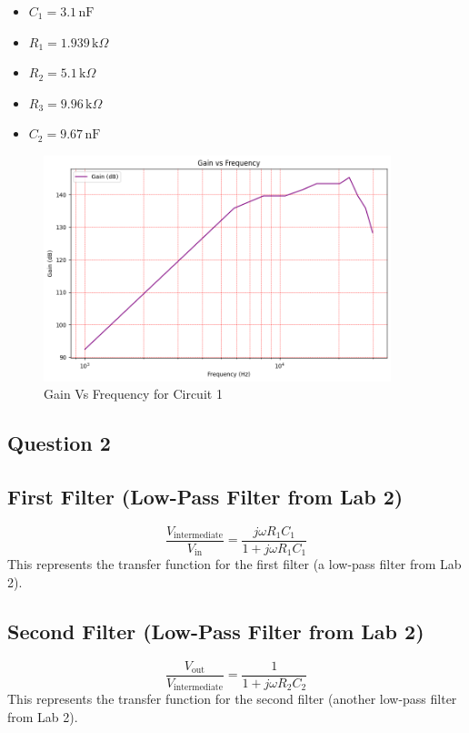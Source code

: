 \documentclass{article}
\begin{document}
\begin{itemize}
    \item \( C_1 = 3.1 \, \text{nF} \)
    \item \( R_1 = 1.939 \, \text{k}\Omega \)
    \item \( R_2 = 5.1 \, \text{k}\Omega \)
    \item \( R_3 = 9.96 \, \text{k}\Omega \)
    \item \( C_2 = 9.67 \, \text{nF} \)
\end{itemize}

\begin{figure}[H]
    \centering
    \includegraphics[width=0.9\textwidth]{./img/Lab3_1.png}  %
    \caption{Gain Vs Frequency for Circuit 1}
\end{figure}


\subsection{ Question 2}

\subsection*{First Filter (Low-Pass Filter from Lab 2)}
\[
\frac{V_{\text{intermediate}}}{V_{\text{in}}} = \frac{j \omega R_1 C_1}{1 + j \omega R_1 C_1}
\]
This represents the transfer function for the first filter (a low-pass filter from Lab 2).

\subsection*{Second Filter (Low-Pass Filter from Lab 2)}
\[
\frac{V_{\text{out}}}{V_{\text{intermediate}}} = \frac{1}{1 + j \omega R_2 C_2}
\]
This represents the transfer function for the second filter (another low-pass filter from Lab 2).
\end{document}
